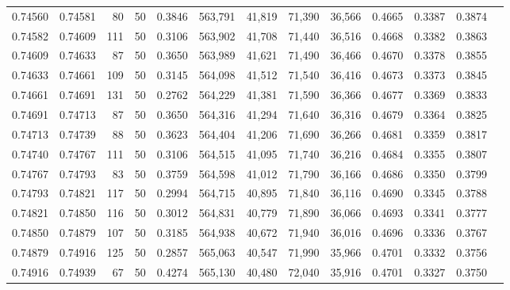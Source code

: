 \begin{tabular}{rrrrrrrrrrrrr}
0.74560 & 0.74581 &    80 &  50 &                                     0.3846 & 563,791 &  41,819 &  71,390 &  36,566 & 0.4665 & 0.3387 & 0.3874 \\
0.74582 & 0.74609 &   111 &  50 &                                     0.3106 & 563,902 &  41,708 &  71,440 &  36,516 & 0.4668 & 0.3382 & 0.3863 \\
0.74609 & 0.74633 &    87 &  50 &                                     0.3650 & 563,989 &  41,621 &  71,490 &  36,466 & 0.4670 & 0.3378 & 0.3855 \\
0.74633 & 0.74661 &   109 &  50 &                                     0.3145 & 564,098 &  41,512 &  71,540 &  36,416 & 0.4673 & 0.3373 & 0.3845 \\
0.74661 & 0.74691 &   131 &  50 &                                     0.2762 & 564,229 &  41,381 &  71,590 &  36,366 & 0.4677 & 0.3369 & 0.3833 \\
0.74691 & 0.74713 &    87 &  50 &                                     0.3650 & 564,316 &  41,294 &  71,640 &  36,316 & 0.4679 & 0.3364 & 0.3825 \\
0.74713 & 0.74739 &    88 &  50 &                                     0.3623 & 564,404 &  41,206 &  71,690 &  36,266 & 0.4681 & 0.3359 & 0.3817 \\
0.74740 & 0.74767 &   111 &  50 &                                     0.3106 & 564,515 &  41,095 &  71,740 &  36,216 & 0.4684 & 0.3355 & 0.3807 \\
0.74767 & 0.74793 &    83 &  50 &                                     0.3759 & 564,598 &  41,012 &  71,790 &  36,166 & 0.4686 & 0.3350 & 0.3799 \\
0.74793 & 0.74821 &   117 &  50 &                                     0.2994 & 564,715 &  40,895 &  71,840 &  36,116 & 0.4690 & 0.3345 & 0.3788 \\
0.74821 & 0.74850 &   116 &  50 &                                     0.3012 & 564,831 &  40,779 &  71,890 &  36,066 & 0.4693 & 0.3341 & 0.3777 \\
0.74850 & 0.74879 &   107 &  50 &                                     0.3185 & 564,938 &  40,672 &  71,940 &  36,016 & 0.4696 & 0.3336 & 0.3767 \\
0.74879 & 0.74916 &   125 &  50 &                                     0.2857 & 565,063 &  40,547 &  71,990 &  35,966 & 0.4701 & 0.3332 & 0.3756 \\
0.74916 & 0.74939 &    67 &  50 &                                     0.4274 & 565,130 &  40,480 &  72,040 &  35,916 & 0.4701 & 0.3327 & 0.3750 \\

\end{tabular}
